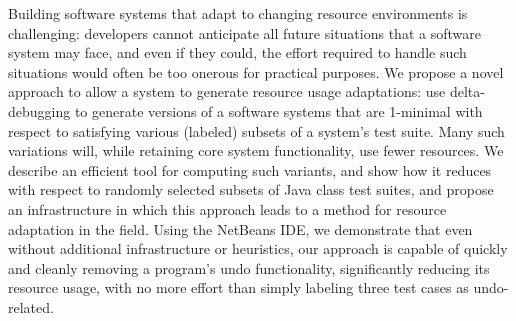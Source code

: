 	Building software systems that adapt to changing resource environments is challenging: developers cannot anticipate all future situations that a software system may face, and even if they could, the effort required to handle such situations would often be too onerous for practical purposes. We propose a novel approach to allow a system to generate resource usage adaptations: use delta-debugging to generate versions of a software systems that are 1-minimal with respect to satisfying various (labeled) subsets of a system's test suite. Many such variations will, while retaining core system functionality, use fewer resources. We describe an efficient tool for computing such variants, and show how it reduces with respect to randomly selected subsets of Java class test suites, and propose an infrastructure in which this approach leads to a method for resource adaptation in the field. Using the NetBeans IDE, we demonstrate that even without additional infrastructure or heuristics, our approach is capable of quickly and cleanly removing a program's undo functionality, significantly reducing its resource usage, with no more effort than simply labeling three test cases as undo-related.